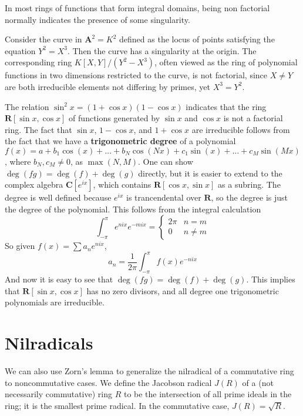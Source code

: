 In most rings of functions that form integral domains, being non factorial normally indicates the presence of some singularity.

\begin{example}
    Consider the curve in $\mathbf{A}^2 = K^2$ defined as the locus of points satisfying the equation $Y^2 = X^3$. Then the curve has a singularity at the origin. The corresponding ring $K[X,Y]/(Y^2 - X^3)$, often viewed as the ring of polynomial functions in two dimensions restricted to the curve, is not factorial, since $X \neq Y$ are both irreducible elements not differing by primes, yet $X^3 = Y^2$.
\end{example}

\begin{example}
    The relation $\sin^2 x = (1 + \cos x)(1 - \cos x)$ indicates that the ring $\mathbf{R}[\sin x, \cos x]$ of functions generated by $\sin x$ and $\cos x$ is not a factorial ring. The fact that $\sin x$, $1 - \cos x$, and $1 + \cos x$ are irreducible follows from the fact that we have a {\bf trigonometric degree} of a polynomial $f(x) = a + b_1 \cos(x) + \dots + b_N \cos(Nx) + c_1 \sin(x) + \dots + c_M \sin(Mx)$, where $b_N, c_M \neq 0$, as $\max(N,M)$. One can show $\deg(fg) = \deg(f) + \deg(g)$ directly, but it is easier to extend to the complex algebra $\mathbf{C}[e^{ix}]$, which contains $\mathbf{R}[\cos x, \sin x]$ as a subring. The degree is well defined because $e^{ix}$ is trancendental over $\mathbf{R}$, so the degree is just the degree of the polynomial. This follows from the integral calculation
    \[ \int_{-\pi}^\pi e^{nix} e^{-mix} = \begin{cases} 2\pi & n = m \\ 0 & n \neq m \end{cases} \]
    So given $f(x) = \sum a_n e^{nix}$,
    \[ a_n = \frac{1}{2\pi} \int_{-\pi}^\pi f(x) e^{-nix} \]
    And now it is easy to see that $\deg(fg) = \deg(f) + \deg(g)$. This implies that $\mathbf{R}[\sin x, \cos x]$ has no zero divisors, and all degree one trigonometric polynomials are irreducible.
\end{example}

\section{Nilradicals}

We can also use Zorn's lemma to generalize the nilradical of a commutative ring to noncommutative cases. We define the Jacobson radical $J(R)$ of a (not necessarily commutative) ring $R$ to be the intersection of all prime ideals in the ring; it is the smallest prime radical. In the commutative case, $J(R) = \sqrt{R}$.

